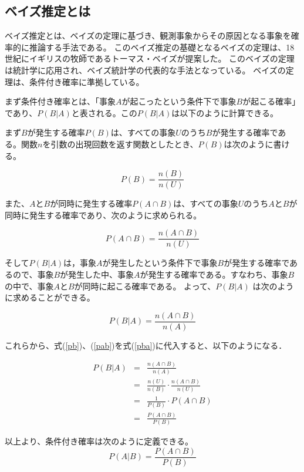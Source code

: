 \documentclass[11pt,a4j]{jsarticle}
\begin{document}
  \subsection{ベイズ推定とは}\label{sec:defbayes}
ベイズ推定とは、ベイズの定理に基づき、観測事象からその原因となる事象を確率的に推論する手法である。
このベイズ推定の基礎となるベイズの定理は、18世紀にイギリスの牧師であるトーマス・ベイズが提案した。
このベイズの定理は統計学に応用され、ベイズ統計学の代表的な手法となっている。
ベイズの定理は、条件付き確率に準拠している。

まず条件付き確率とは、「事象$A$が起こったという条件下で事象$B$が起こる確率」であり、$P(B|A)$と表される。この$P(B|A)$は以下のように計算できる。

まず$B$が発生する確率$P(B)$は、すべての事象$U$のうち$B$が発生する確率である。関数$n$を引数の出現回数を返す関数としたとき、$P(B)$は次のように書ける。

\begin{equation}
  P(B)=\frac{n(B)}{n(U)}
\label{pb}
\end{equation}

また、$A$と$B$が同時に発生する確率$P(A \cap B)$は、すべての事象$U$のうち$A$と$B$が同時に発生する確率であり、次のように求められる。

\begin{equation}
P(A \cap B)=\frac{n(A \cap B)}{n(U)}
\label{pab}
\end{equation}

そして$P(B|A)$は，事象$A$が発生したという条件下で事象$B$が発生する確率であるので、事象$B$が発生した中、事象$A$が発生する確率である。すなわち、事象$B$の中で、事象$A$と$B$が同時に起こる確率である。
よって、$P(B|A)$ は次のように求めることができる。

\begin{equation}
  P(B|A)=\frac{n(A \cap B)}{n(A)}
\label{pba}
\end{equation}

これらから、式(\ref{pb})、(\ref{pab})を式(\ref{pba})に代入すると、以下のようになる．

\begin{eqnarray*}
  P(B|A) & = & \frac{n(A \cap B)}{n(A)}\\
         & = & \frac{n(U)}{n(B)} \cdot \frac{n(A \cap B)}{n(U)} \\
         & = & \frac{1}{P(B)} \cdot P(A \cap B) \\
         & = & \frac{P(A \cap B)}{P(B)}
\end{eqnarray*}

以上より、条件付き確率は次のように定義できる。
\[
  P(A|B)=\frac{P(A \cap B)}{P(B)}
\]
\end{document}
